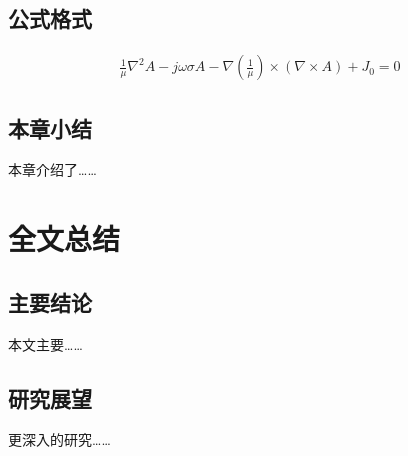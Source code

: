 \subsection{公式格式}

\vspace{-10mm}
\begin{eqnarray}
\frac{1}{\mu} \nabla^2A - j \omega \sigma A -\nabla(\frac{1}{\mu}) \times(\nabla \times A)+J_0=0
\end{eqnarray}

\subsection{本章小结}
本章介绍了……

\newpage
{}
\section{全文总结}

\subsection{主要结论}
本文主要……

\subsection{研究展望}
更深入的研究……